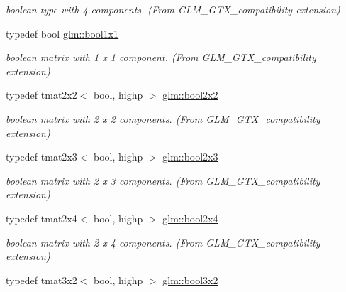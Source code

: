 \begin{DoxyCompactItemize}
\begin{DoxyCompactList}\small\item\em boolean type with 4 components. (From G\-L\-M\-\_\-\-G\-T\-X\-\_\-compatibility extension) \end{DoxyCompactList}\item 
\hypertarget{group__gtx__compatibility_ga98d9d3da22aebc872ba38ce5afa0eff7}{typedef bool \hyperlink{group__gtx__compatibility_ga98d9d3da22aebc872ba38ce5afa0eff7}{glm\-::bool1x1}}\label{group__gtx__compatibility_ga98d9d3da22aebc872ba38ce5afa0eff7}

\begin{DoxyCompactList}\small\item\em boolean matrix with 1 x 1 component. (From G\-L\-M\-\_\-\-G\-T\-X\-\_\-compatibility extension) \end{DoxyCompactList}\item 
\hypertarget{group__gtx__compatibility_gaeb49db4b236907ba11f5b9117274b5d8}{typedef tmat2x2$<$ bool, highp $>$ \hyperlink{group__gtx__compatibility_gaeb49db4b236907ba11f5b9117274b5d8}{glm\-::bool2x2}}\label{group__gtx__compatibility_gaeb49db4b236907ba11f5b9117274b5d8}

\begin{DoxyCompactList}\small\item\em boolean matrix with 2 x 2 components. (From G\-L\-M\-\_\-\-G\-T\-X\-\_\-compatibility extension) \end{DoxyCompactList}\item 
\hypertarget{group__gtx__compatibility_ga2d7e2c79179868a41d1f9f7a63f2ae52}{typedef tmat2x3$<$ bool, highp $>$ \hyperlink{group__gtx__compatibility_ga2d7e2c79179868a41d1f9f7a63f2ae52}{glm\-::bool2x3}}\label{group__gtx__compatibility_ga2d7e2c79179868a41d1f9f7a63f2ae52}

\begin{DoxyCompactList}\small\item\em boolean matrix with 2 x 3 components. (From G\-L\-M\-\_\-\-G\-T\-X\-\_\-compatibility extension) \end{DoxyCompactList}\item 
\hypertarget{group__gtx__compatibility_gacbd1c62dfad23155dba803d7c5125288}{typedef tmat2x4$<$ bool, highp $>$ \hyperlink{group__gtx__compatibility_gacbd1c62dfad23155dba803d7c5125288}{glm\-::bool2x4}}\label{group__gtx__compatibility_gacbd1c62dfad23155dba803d7c5125288}

\begin{DoxyCompactList}\small\item\em boolean matrix with 2 x 4 components. (From G\-L\-M\-\_\-\-G\-T\-X\-\_\-compatibility extension) \end{DoxyCompactList}\item 
\hypertarget{group__gtx__compatibility_ga6a944ad10139c8915bf72a832273ff02}{typedef tmat3x2$<$ bool, highp $>$ \hyperlink{group__gtx__compatibility_ga6a944ad10139c8915bf72a832273ff02}{glm\-::bool3x2}}\label{group__gtx__compatibility_ga6a944ad10139c8915bf72a832273ff02}


\end{DoxyCompactItemize}
